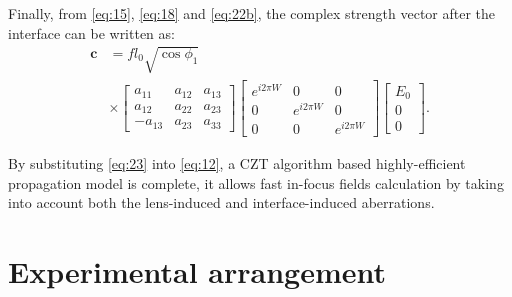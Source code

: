 \documentclass[9pt,twocolumn,twoside]{osajnl}
\begin{document}
Finally, from \eqref{eq:15}, \eqref{eq:18} and \eqref{eq:22b}, the complex strength vector after the interface can be written as:
	\begin{equation}
		\begin{aligned}\label{eq:23}
			\mathbf{c}&=f l_0\sqrt{\cos\phi_1}\\
			&\times\begin{bmatrix}
				a_{11} & a_{12} & a_{13}\\
				a_{12} & a_{22} & a_{23}\\
				-a_{13} & a_{23} & a_{33}
				\end{bmatrix}
				\begin{bmatrix}
					e^{i2\pi W}&0&0\\
					0&e^{i2\pi W}&0\\
					0&0&e^{i2\pi W}
				\end{bmatrix}
				\begin{bmatrix}
					E_0\\
					0\\
					0
				\end{bmatrix}.
		\end{aligned}
	\end{equation}	

By substituting \eqref{eq:23} into \eqref{eq:12}, a CZT algorithm based highly-efficient propagation model is complete, it allows fast in-focus fields calculation by taking into account both the lens-induced and interface-induced aberrations.

\section{Experimental arrangement}
\end{document}
